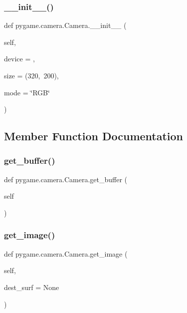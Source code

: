 \subsubsection{\texorpdfstring{\+\_\+\+\_\+init\+\_\+\+\_\+()}{\_\_init\_\_()}}
{\footnotesize\ttfamily def pygame.\+camera.\+Camera.\+\_\+\+\_\+init\+\_\+\+\_\+ (\begin{DoxyParamCaption}\item[{}]{self,  }\item[{}]{device = {},  }\item[{}]{size = {\ttfamily (320,~200)},  }\item[{}]{mode = {\ttfamily \char`\"{}RGB\char`\"{}} }\end{DoxyParamCaption})}

\begin{DoxyVerb}\end{DoxyVerb}
 

\subsection{Member Function Documentation}
\mbox{\label{classpygame_1_1camera_1_1_camera_a8e3a1948f3990f5e60faaaf951874484}} 
\subsubsection{\texorpdfstring{get\+\_\+buffer()}{get\_buffer()}}
{\footnotesize\ttfamily def pygame.\+camera.\+Camera.\+get\+\_\+buffer (\begin{DoxyParamCaption}\item[{}]{self }\end{DoxyParamCaption})}

\begin{DoxyVerb}\end{DoxyVerb}
 \mbox{\label{classpygame_1_1camera_1_1_camera_a76e94c007b2a78249688209c31cacd42}} 
\subsubsection{\texorpdfstring{get\+\_\+image()}{get\_image()}}
{\footnotesize\ttfamily def pygame.\+camera.\+Camera.\+get\+\_\+image (\begin{DoxyParamCaption}\item[{}]{self,  }\item[{}]{dest\+\_\+surf = {\ttfamily None} }\end{DoxyParamCaption})}


